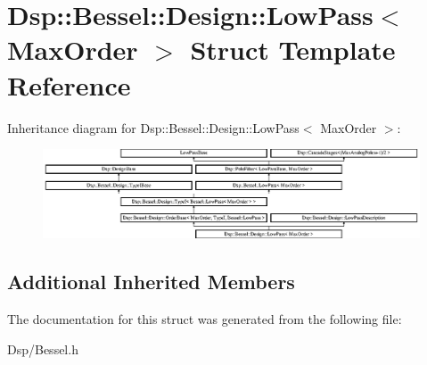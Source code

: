 \hypertarget{structDsp_1_1Bessel_1_1Design_1_1LowPass}{\section{Dsp\-:\-:Bessel\-:\-:Design\-:\-:Low\-Pass$<$ Max\-Order $>$ Struct Template Reference}
\label{structDsp_1_1Bessel_1_1Design_1_1LowPass}
}
Inheritance diagram for Dsp\-:\-:Bessel\-:\-:Design\-:\-:Low\-Pass$<$ Max\-Order $>$\-:\begin{figure}[H]
\begin{center}
\leavevmode
\includegraphics[height=2.654028cm]{structDsp_1_1Bessel_1_1Design_1_1LowPass}
\end{center}
\end{figure}
\subsection*{Additional Inherited Members}


The documentation for this struct was generated from the following file\-:\begin{DoxyCompactItemize}
\item 
Dsp/Bessel.\-h\end{DoxyCompactItemize}
